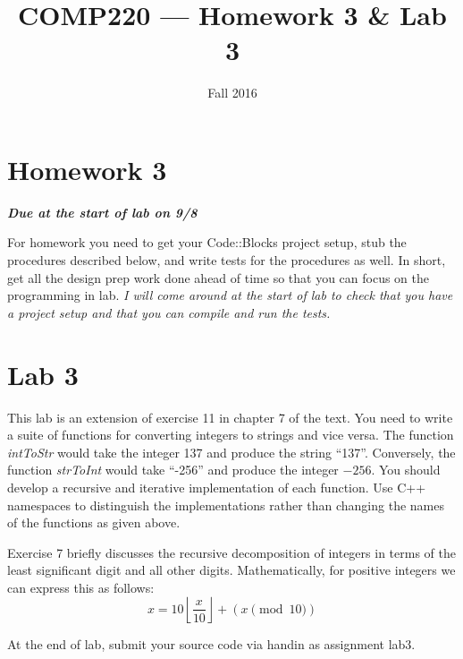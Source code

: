 \documentclass[10pt]{article}
\title{COMP220 --- Homework 3 \& Lab 3}
\author{ }
\date{Fall 2016}
\begin{document}
\maketitle

\begin{abstract}

\end{abstract}

\section{Homework 3}

\begin{center}
\textbf{\textit{Due at the start of lab on 9/8}}
\end{center}

For homework you need to get your Code::Blocks project setup, stub the procedures described below, and write tests for the procedures as well.  In short, get all the design prep work done ahead of time so that you can focus on the programming in lab. \textit{I will come around at the start of lab to check that you have a project setup and that you can compile and run the tests.}

\section{Lab 3}

This lab is an extension of exercise 11 in chapter 7 of the text.  You need to write a suite of functions for converting integers to strings and vice versa.  The function \textit{intToStr} would take the integer 137 and produce the string ``137''. Conversely, the function \textit{strToInt} would take ``-256'' and produce the integer $-256$. You should develop a recursive and iterative implementation of each function. Use C++ namespaces to distinguish the implementations rather than changing the names of the functions as given above.


Exercise 7 briefly discusses the recursive decomposition of integers in terms of the least significant digit and all other digits. Mathematically, for positive integers we can express this as follows:
\begin{equation}
  x = 10 \left\lfloor \frac{x}{10} \right\rfloor + (x \pmod{10})
\end{equation}

At the end of lab, submit your source code via handin as assignment lab3.
\end{document}
